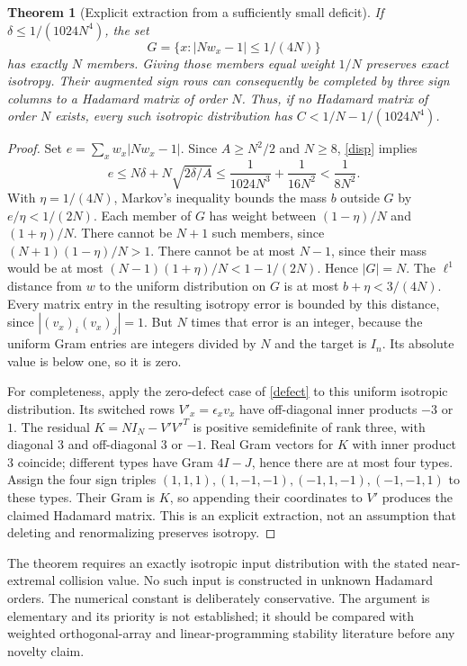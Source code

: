 \documentclass[11pt]{article}
\newtheorem{theorem}{Theorem}
\begin{document}
\begin{theorem}[Explicit extraction from a sufficiently small deficit]
If $\delta\le1/(1024N^4)$, the set
\[
 G=\{x:|Nw_x-1|\le1/(4N)\}
\]
has exactly $N$ members. Giving those members equal weight $1/N$
preserves exact isotropy. Their augmented sign rows can consequently
be completed by three sign columns to a Hadamard matrix of order $N$.
Thus, if no Hadamard matrix of order $N$ exists, every such isotropic
distribution has $C<1/N-1/(1024N^4)$.
\end{theorem}
\begin{proof}
Set $e=\sum_xw_x|Nw_x-1|$. Since $A\ge N^2/2$ and $N\ge8$,
\eqref{disp} implies
\[
 e\le N\delta+N\sqrt{2\delta/A}
 \le\frac1{1024N^3}+\frac1{16N^2}<\frac1{8N^2}.
\]
With $\eta=1/(4N)$, Markov's inequality bounds the mass $b$ outside
$G$ by $e/\eta<1/(2N)$. Each member of $G$ has weight between
$(1-\eta)/N$ and $(1+\eta)/N$. There cannot be $N+1$ such members,
since $(N+1)(1-\eta)/N>1$. There cannot be at most $N-1$, since
their mass would be at most $(N-1)(1+\eta)/N<1-1/(2N)$.
Hence $|G|=N$.
The $\ell^1$ distance from $w$ to the uniform distribution on $G$ is
at most $b+\eta<3/(4N)$. Every matrix entry in the resulting isotropy
error is bounded by this distance, since $|(v_x)_i(v_x)_j|=1$.
But $N$ times that error is an integer, because the uniform Gram
entries are integers divided by $N$ and the target is $I_n$.
Its absolute value is below one, so it is zero.

For completeness, apply the zero-defect case of \eqref{defect} to
this uniform isotropic distribution. Its switched rows
$V'_x=\epsilon_xv_x$ have off-diagonal inner products $-3$ or $1$.
The residual $K=NI_N-V'V'^T$ is positive semidefinite of rank three,
with diagonal $3$ and off-diagonal $3$ or $-1$. Real Gram vectors for
$K$ with inner product $3$ coincide; different types have Gram
$4I-J$, hence there are at most four types. Assign the four sign
triples $(1,1,1),(1,-1,-1),(-1,1,-1),(-1,-1,1)$ to these types.
Their Gram is $K$, so appending their coordinates to $V'$ produces
the claimed Hadamard matrix. This is an explicit extraction, not an
assumption that deleting and renormalizing preserves isotropy.
\end{proof}

The theorem requires an exactly isotropic input distribution with the
stated near-extremal collision value. No such input is constructed in
unknown Hadamard orders. The numerical constant is deliberately
conservative. The argument is elementary and its priority is not
established; it should be compared with weighted orthogonal-array and
linear-programming stability literature before any novelty claim.
\end{document}
